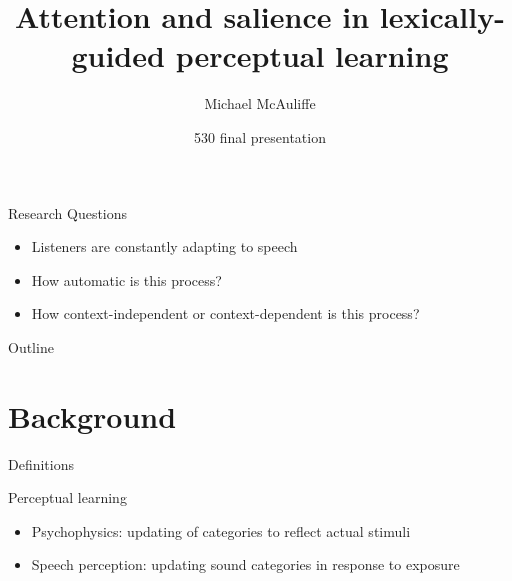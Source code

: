 \documentclass{beamer}
\title %
{Attention and salience in lexically-guided perceptual learning}
\author %
{Michael McAuliffe}
\date
{530 final presentation}
\begin{document}
\begin{frame}
  \titlepage
\end{frame}

\begin{frame}{Research Questions}

\begin{itemize}
\item Listeners are constantly adapting to speech
\item How automatic is this process?
\item How context-independent or context-dependent is this process?
\end{itemize}
\end{frame}

\begin{frame}{Outline}
  \tableofcontents
\end{frame}




\section{Background}

\begin{frame}{Definitions}

    Perceptual learning
\begin{itemize}
\item Psychophysics: updating of categories to reflect actual stimuli \citep{Gibson1953}
\item Speech perception: updating sound categories in response to exposure \citep{Norris2003}
\end{itemize}
 
\end{frame}
\end{document}
